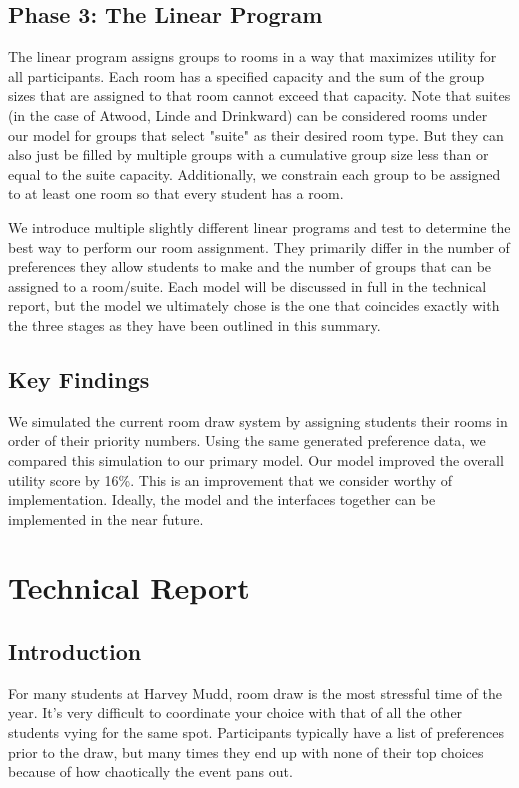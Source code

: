 \documentclass[12pt]{article}
\begin{document}
    \subsection*{Phase 3: The Linear Program} 
    The linear program assigns groups to rooms in a way that maximizes utility for all participants. Each room has a specified capacity and the sum of the group sizes that are assigned to that room cannot exceed that capacity. Note that suites (in the case of Atwood, Linde and Drinkward) can be considered rooms under our model for groups that select "suite" as their desired room type. But they can also just be filled by multiple groups with a cumulative group size less than or equal to the suite capacity. Additionally, we constrain each group to be assigned to at least one room so that every student has a room. 
    
    We introduce multiple slightly different linear programs and test to determine the best way to perform our room assignment. They primarily differ in the number of preferences they allow students to make and the number of groups that can be assigned to a room/suite. Each model will be discussed in full in the technical report, but the model we ultimately chose is the one that coincides exactly with the three stages as they have been outlined in this summary. 
    
    \subsection*{Key Findings}
    We simulated the current room draw system by assigning students their rooms in order of their priority numbers. Using the same generated preference data, we compared this simulation to our primary model. Our model improved the overall utility score by 16\%. This is an improvement that we consider worthy of implementation. Ideally, the model and the interfaces together can be implemented in the near future. 
    
    \section*{Technical Report}
    \subsection*{Introduction}
    For many students at Harvey Mudd, room draw is the most stressful time of the year. It's very difficult to coordinate your choice with that of all the other students vying for the same spot. Participants typically have a list of preferences prior to the draw, but many times they end up with none of their top choices because of how chaotically the event pans out. 
    
\end{document}
